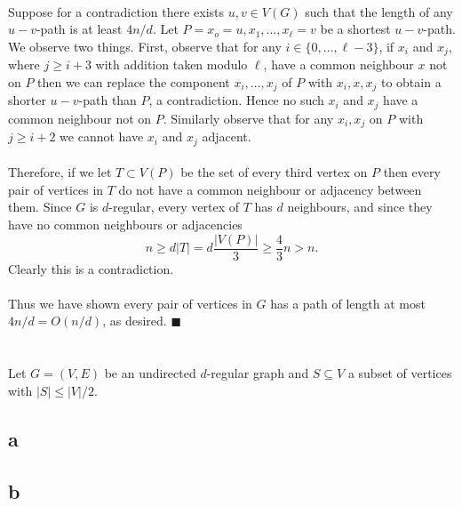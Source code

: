 \documentclass[letterpaper,12pt,oneside,onecolumn]{article}
\begin{document}
	\paragraph{}
	Suppose for a contradiction there exists $u,v \in V(G)$ such that the length of any $u-v$-path is at least $4n/d$. Let $P=x_o=u, x_1, \dots, x_\ell=v$ be a shortest $u-v$-path. We observe two things. First, observe that for any $i \in \{0,\dots, \ell-3\}$, if $x_i$ and $x_{j}$, where $j \geq i+3$ with addition taken modulo $\ell$, have a common neighbour $x$ not on $P$ then we can replace the component $x_i,\dots, x_j$ of $P$ with $x_i, x, x_{j}$ to obtain a shorter $u-v$-path than $P$, a contradiction. Hence no such $x_i$ and $x_{j}$ have a common neighbour not on $P$. Similarly observe that for any $x_i, x_j$ on $P$ with $j \geq i+2$ we cannot have $x_i$ and $x_j$ adjacent. 
	\paragraph{}
	Therefore, if we let $T\subset V(P)$ be the set of every third vertex on $P$ then every pair of vertices in $T$ do not have a common neighbour or adjacency between them. Since $G$ is $d$-regular, every vertex of $T$ has $d$ neighbours, and since they have no common neighbours or adjacencies
	$$n \geq d|T| =d\frac{|V(P)|}{3} \geq \frac{4}{3}n > n.$$
	Clearly this is a contradiction.
	\paragraph{}
	Thus we have shown every pair of vertices in $G$ has a path of length at most $4n/d = O(n/d)$, as desired. $\blacksquare$
	\newpage
	\section{}
	\paragraph{}
	Let $G=(V,E)$ be an undirected $d$-regular graph and $S\subseteq V$ a subset of vertices with $|S| \leq |V|/2$.
	\subsection{a}
	\paragraph{}
	
	
	\subsection{b}
\end{document}
